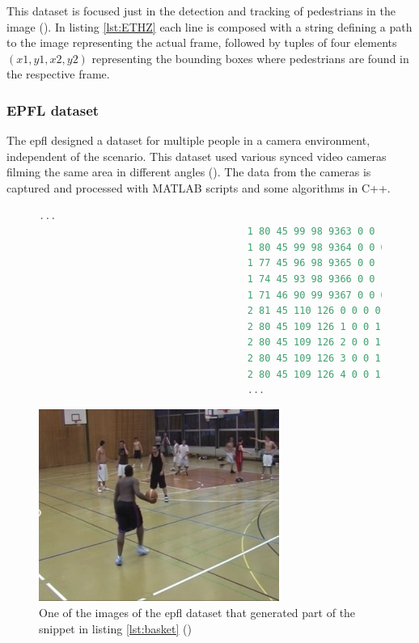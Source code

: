 This dataset is focused just in the detection and tracking of pedestrians in the image (\cite{ETHZEidgenossischeTechnischeHochschuleZurich}). In listing \ref{lst:ETHZ} each line is composed with a string defining a path to the image representing the actual frame, followed by tuples of four elements $(x1,y1,x2,y2)$ representing the bounding boxes where pedestrians are found in the respective frame. 

\subsubsection{EPFL dataset}
The \gls{epfl} designed a dataset for multiple people in a camera environment, independent of the scenario. This dataset used various synced video cameras filming the same area in different angles (\cite{Biliotti}). The data from the cameras is captured and processed with MATLAB scripts and some algorithms in C++.

\begin{figure}
\begin{center}
	\begin{lstlisting}[label={lst:basket}, caption={EPFL dataset file snippet (\cite{EPFLEcolepolytechniquefederaledeLausanne})},language=c++]
									...
									1 80 45 99 98 9363 0 0 1 "PERSON"
									1 80 45 99 98 9364 0 0 0 "PERSON"
									1 77 45 96 98 9365 0 0 1 "PERSON"
									1 74 45 93 98 9366 0 0 1 "PERSON"
									1 71 46 90 99 9367 0 0 0 "PERSON"
									2 81 45 110 126 0 0 0 0 "PERSON"
									2 80 45 109 126 1 0 0 1 "PERSON"
									2 80 45 109 126 2 0 0 1 "PERSON"
									2 80 45 109 126 3 0 0 1 "PERSON"
									2 80 45 109 126 4 0 0 1 "PERSON"
									...	\end{lstlisting}
\end{center}
\end{figure}

\begin{figure}[htp]
	
	\centering
	\includegraphics[width=0.7\textwidth]{capstate/imgs/basket.png}
	
	\caption{One of the images of the \gls{epfl} dataset that generated part of the snippet in listing \ref{lst:basket} (\cite{EPFLEcolepolytechniquefederaledeLausanne})}
	\label{fig:basketimg}
	
\end{figure}


